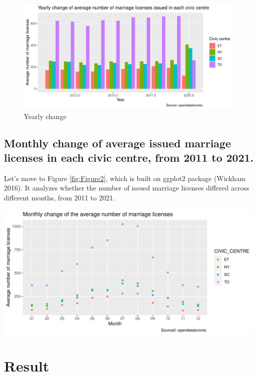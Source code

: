 \documentclass[
]{article}
\begin{document}
\begin{figure}
\centering
\includegraphics{Paper1_files/figure-latex/Figure1-1.pdf}
\caption{\label{fig:Figure1}Yearly change}
\end{figure}

\hypertarget{monthly-change-of-average-issued-marriage-licenses-in-each-civic-centre-from-2011-to-2021.}{%
\subsection{Monthly change of average issued marriage licenses in each civic centre, from 2011 to 2021.}\label{monthly-change-of-average-issued-marriage-licenses-in-each-civic-centre-from-2011-to-2021.}}

Let's move to Figure \ref{fig:Figure2}, which is built on ggplot2 package (Wickham 2016). It analyzes whether the number of issued marriage licenses differed across different months, from 2011 to 2021.

\includegraphics{Paper1_files/figure-latex/Figure2-1.pdf}
\newpage

\hypertarget{result}{%
\section{Result}\label{result}}
\end{document}
